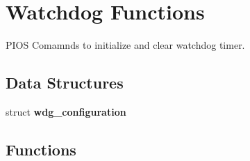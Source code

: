 \hypertarget{group___p_i_o_s___w_d_g}{\section{Watchdog Functions}
\label{group___p_i_o_s___w_d_g}
}


P\-I\-O\-S Comamnds to initialize and clear watchdog timer.  


\subsection*{Data Structures}
\begin{DoxyCompactItemize}
\item 
struct {\bfseries wdg\-\_\-configuration}
\end{DoxyCompactItemize}
\subsection*{Functions}

